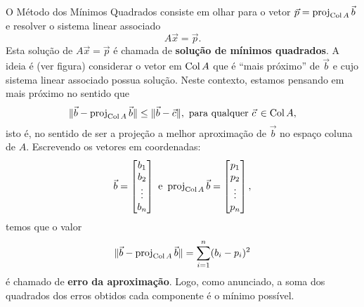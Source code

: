 \documentclass[../livro.tex]{subfiles}  %
\begin{document}
O Método dos Mínimos Quadrados consiste em olhar para o vetor $\vec{p} = \operatorname{proj}_{\operatorname{Col} A} \vec{b}$ e resolver o sistema linear associado
\[
A \vec{x} = \vec{p}.
\] Esta solução de $A \vec{x} = \vec{p}$ é chamada de \textbf{solução de mínimos quadrados}. A ideia é (ver figura) considerar o vetor em $\operatorname{Col} A$ que é ``mais próximo'' de $\vec{b}$ e cujo sistema linear associado possua solução. Neste contexto, estamos pensando em mais próximo no sentido que
\[
\| \vec{b} - \operatorname{proj}_{\operatorname{Col} A} \vec{b} \| \le \| \vec{b} - \vec{c} \|, \text{ para qualquer } \vec{c}\, \in \operatorname{Col} A,
\] isto é, no sentido de ser a projeção a melhor aproximação de $\vec{b}$ no espaço coluna de $A$. Escrevendo os vetores em coordenadas:
\[
\vec{b} =
\begin{bmatrix}
  b_1 \\ b_2 \\ \vdots \\ b_n
\end{bmatrix} \ \text{e} \
\operatorname{proj}_{\operatorname{Col} A} \vec{b} =
\begin{bmatrix}
  p_1 \\ p_2 \\ \vdots \\ p_n
\end{bmatrix},
\] temos que o valor
\[
\| \vec{b} - \operatorname{proj}_{\operatorname{Col} A} \vec{b} \| = \sum_{i=1}^n (b_i - p_i)^2
\] é chamado de \textbf{erro da aproximação}. Logo, como anunciado, a soma dos quadrados dos erros obtidos cada componente é o mínimo possível.
\end{document}
